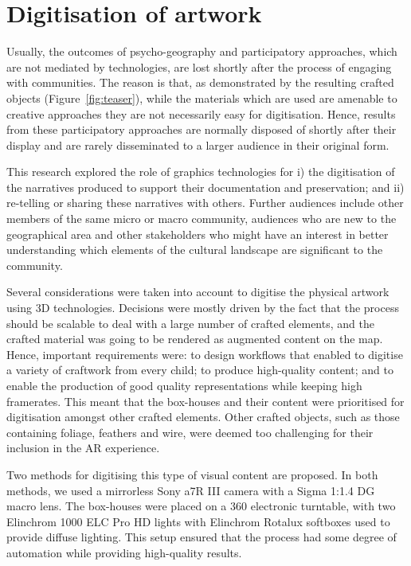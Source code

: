 \documentclass[acmlarge,screen,dvipsnames]{acmart}
\begin{document}
\section{Digitisation of artwork} 
\label{dig} 
Usually, the
outcomes of psycho-geography and participatory approaches, which are not
mediated by technologies, are lost shortly after the process of engaging with
communities. The reason is that, as demonstrated by the resulting crafted
objects (Figure~\ref{fig:teaser}), while the materials which are used  are
amenable to creative approaches they are not necessarily easy for
digitisation. Hence, results from these participatory approaches are normally
disposed of shortly after their display and are rarely disseminated to
 a larger audience in their original form. 

This research explored the role of graphics technologies for i) the
digitisation of the narratives produced to support their
documentation and preservation; and ii) re-telling or sharing these narratives with others.
Further audiences include other members of the same micro or macro community, audiences who are
new to the geographical area and other stakeholders who might have an interest
in better understanding which elements of the cultural landscape are
significant to the community.

Several considerations were taken into account to digitise the
physical artwork using 3D technologies. Decisions were mostly driven by
the fact that the process should be scalable to deal with a large number of
crafted elements, and the crafted material was going to be rendered
as augmented content on the map. Hence, important requirements were: to
design workflows that enabled to digitise a variety of craftwork from every child; to produce
high-quality content; and to enable the production of good quality
representations while keeping high framerates. This meant that
the box-houses and their content were prioritised for digitisation
amongst other crafted elements. Other crafted objects, such as those
containing foliage, feathers and wire, were deemed too challenging for
their inclusion in the AR experience.

Two methods for digitising this type of visual content are proposed. In both methods, we used a mirrorless Sony a7R III camera with a Sigma 1:1.4 DG
macro lens. The box-houses were placed on a 360 electronic turntable, with two
Elinchrom 1000 ELC Pro HD lights with Elinchrom Rotalux softboxes used to
provide diffuse lighting. This setup ensured that the process had some degree of automation while providing
high-quality results.
\end{document}
